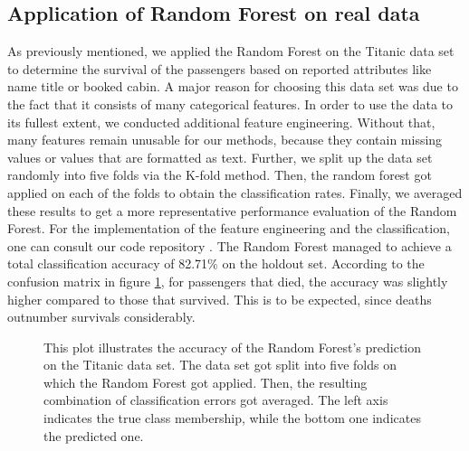 \subsection{Application of Random Forest on real data}
\label{sec:real_data}
As previously mentioned, we applied the Random Forest on the Titanic data set \cite{titanicData} to 
determine the survival of the passengers based on reported attributes like name title or booked cabin.
A major reason for choosing this data set was due to the fact that it consists of many categorical features.
In order to use the data to its fullest extent, we conducted additional feature engineering. 
Without that, many features remain unusable for our methods, 
because they contain missing values or values that are formatted as text.
Further, we split up the data set randomly into five folds via the K-fold method.
Then, the random forest got applied on each of the folds to obtain the classification rates.
Finally, we averaged these results to get a more representative performance evaluation of the Random Forest.
For the implementation of the feature engineering and the classification,
one can consult our code repository \cite{githubApplication}.
The Random Forest managed to achieve a total classification accuracy of 82.71\% on the holdout set.
According to the confusion matrix in figure \ref{fig:confusion_matrix_random_forest}, for passengers that died, 
the accuracy was slightly higher compared to those that survived. This is to be expected,
since deaths outnumber survivals considerably.

\begin{figure}[H]
    \captionsetup{format=plain}
    \caption
        {This plot illustrates the accuracy of the Random Forest's prediction on the Titanic data set.
        The data set got split into five folds on which the Random Forest got applied. 
        Then, the resulting combination of classification errors got averaged.
        The left axis indicates the true class membership, while the bottom one indicates the predicted one. 
        }
    \label{fig:confusion_matrix_random_forest}
\end{figure}


